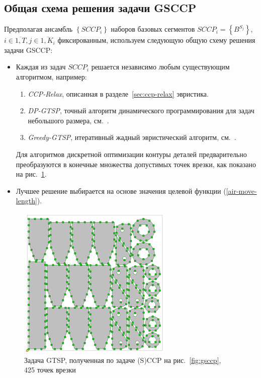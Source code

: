 \documentclass[10pt]{SPIIRAS_Proceedings}
\begin{document}
\subsection*{Общая схема решения задачи GSCCP}

Предполагая ансамбль
$\left\{ SCCP_i \right\}$
наборов базовых сегментов
$SCCP_i = \left\{B^{S_j}\right\}$,
$
i \in \overline{1, T},
j \in \overline{1, K_i}
$
фиксированным,
используем следующую
общую схему решения задачи GSCCP:

\begin{itemize}
  \item
  Каждая из задач $SCCP_i$
  решается независимо
  любым существующим алгоритмом,
  например:
  \begin{enumerate}
    \item
    {\it CCP-Relax},
    описанная в разделе~\ref{sec:ccp-relax} эвристика.
    \item
    {\it DP-GTSP},
    точный алгоритм динамического программирования
    для задач небольшого размера,
    см.~\cite{bi15}.
    \item
    {\it Greedy-GTSP},
    итеративный жадный эвристический алгоритм,
    см.~\cite{bib:greedy}.
  \end{enumerate}
  Для алгоритмов дискретной оптимизации
  контуры деталей предварительно преобразуются
  в конечные множества допустимых точек врезки,
  как показано на рис.~\ref{fig:gtsp425}.

  \item
  Лучшее решение выбирается
  на основе значения целевой функции
  (\ref{air-move-length}).
\end{itemize}

\begin{figure}
  \centering
  \includegraphics[width=0.5\columnwidth]{gtsp425.png}
  \caption{
    Задача GTSP, полученная по задаче (S)CCP на рис.~\ref{fig:gsccp},\\
    425 точек врезки
  }
  \label{fig:gtsp425}
\end{figure}
\end{document}
